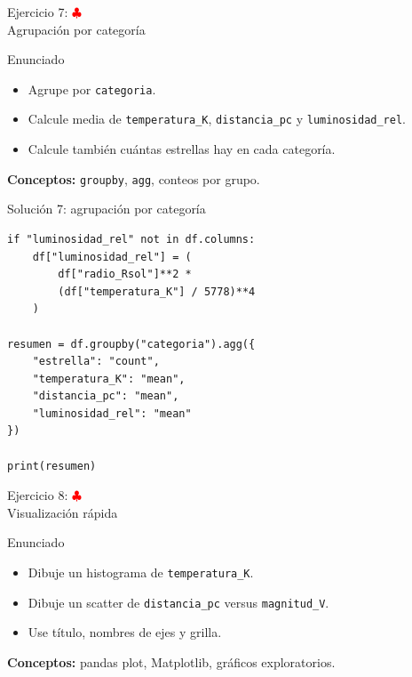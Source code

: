 \documentclass[10pt]{beamer}
\begin{document}
\begin{frame}{Ejercicio 7: \hfill \textcolor{red}{$\clubsuit$} \\ Agrupación por categoría}
  \begin{block}{Enunciado}
    \begin{itemize}
      \item Agrupe por \texttt{categoria}.
      \item Calcule media de \texttt{temperatura\_K}, \texttt{distancia\_pc} y \texttt{luminosidad\_rel}.
      \item Calcule también cuántas estrellas hay en cada categoría.
    \end{itemize}
  \end{block}
  \textbf{Conceptos:} \texttt{groupby}, \texttt{agg}, conteos por grupo.
\end{frame}

\begin{solutionblock}
\begin{frame}[fragile,shrink=5]{Solución 7: agrupación por categoría}
\begin{verbatim}
if "luminosidad_rel" not in df.columns:
    df["luminosidad_rel"] = (
        df["radio_Rsol"]**2 *
        (df["temperatura_K"] / 5778)**4
    )

resumen = df.groupby("categoria").agg({
    "estrella": "count",
    "temperatura_K": "mean",
    "distancia_pc": "mean",
    "luminosidad_rel": "mean"
})

print(resumen)
\end{verbatim}
\end{frame}
\end{solutionblock}

\begin{frame}{Ejercicio 8: \hfill \textcolor{red}{$\clubsuit$} \\ Visualización rápida}
  \begin{block}{Enunciado}
    \begin{itemize}
      \item Dibuje un histograma de \texttt{temperatura\_K}.
      \item Dibuje un scatter de \texttt{distancia\_pc} versus \texttt{magnitud\_V}.
      \item Use título, nombres de ejes y grilla.
    \end{itemize}
  \end{block}
  \textbf{Conceptos:} pandas plot, Matplotlib, gráficos exploratorios.
\end{frame}
\end{document}
